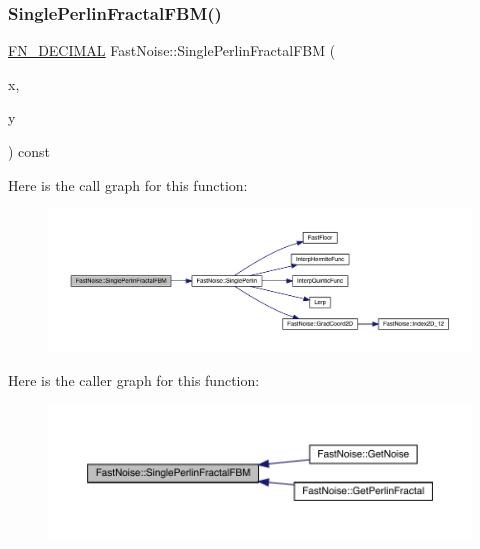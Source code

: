 \subsubsection{\texorpdfstring{Single\+Perlin\+Fractal\+F\+B\+M()}{SinglePerlinFractalFBM()}\hspace{0.1cm}{\footnotesize\ttfamily [1/2]}}
{\footnotesize\ttfamily \mbox{\hyperlink{_fast_noise_8h_a75a9ef6d2541c4921815b885bfd449c3}{F\+N\+\_\+\+D\+E\+C\+I\+M\+AL}} Fast\+Noise\+::\+Single\+Perlin\+Fractal\+F\+BM (\begin{DoxyParamCaption}\item[{\mbox{\hyperlink{_fast_noise_8h_a75a9ef6d2541c4921815b885bfd449c3}{F\+N\+\_\+\+D\+E\+C\+I\+M\+AL}}}]{x,  }\item[{\mbox{\hyperlink{_fast_noise_8h_a75a9ef6d2541c4921815b885bfd449c3}{F\+N\+\_\+\+D\+E\+C\+I\+M\+AL}}}]{y }\end{DoxyParamCaption}) const\hspace{0.3cm}{\ttfamily [private]}}

Here is the call graph for this function\+:
\nopagebreak
\begin{figure}[H]
\begin{center}
\leavevmode
\includegraphics[width=350pt]{class_fast_noise_a6f38e0737ecab4f680e41936f5381141_cgraph}
\end{center}
\end{figure}
Here is the caller graph for this function\+:
\nopagebreak
\begin{figure}[H]
\begin{center}
\leavevmode
\includegraphics[width=350pt]{class_fast_noise_a6f38e0737ecab4f680e41936f5381141_icgraph}
\end{center}
\end{figure}
\mbox{\label{class_fast_noise_ab2189c13cfabb4e900c6e63d74962ce2}} 
